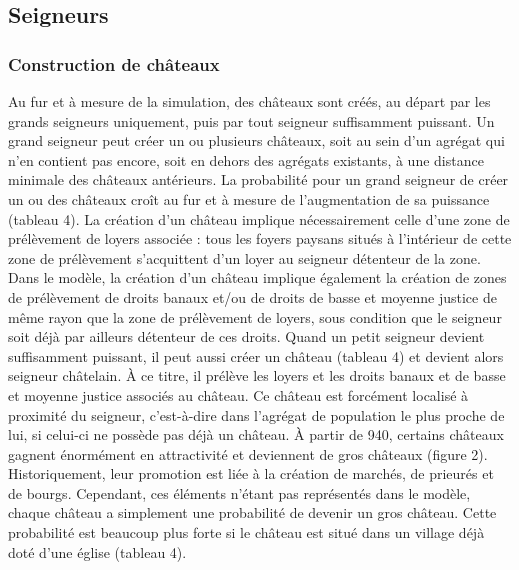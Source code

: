 \subsection{Seigneurs}

\subsubsection{Construction de châteaux}

Au fur et à mesure de la simulation, des châteaux sont créés, au départ par les grands seigneurs uniquement, puis par tout seigneur suffisamment puissant.
Un grand seigneur peut créer un ou plusieurs châteaux, soit au sein d'un agrégat qui n'en contient pas encore, soit en dehors des agrégats existants, à une distance minimale des châteaux antérieurs.
La probabilité pour un grand seigneur de créer un ou des châteaux croît au fur et à mesure de l'augmentation de sa puissance (tableau 4).
La création d'un château implique nécessairement celle d'une zone de prélèvement de loyers associée :
tous les foyers paysans situés à l'intérieur de cette zone de prélèvement s'acquittent d'un loyer au seigneur détenteur de la zone.
Dans le modèle, la création d'un château implique également la création de zones de prélèvement de droits banaux et/ou de droits de basse et moyenne justice de même rayon que la zone de prélèvement de loyers, sous condition que le seigneur soit déjà par ailleurs détenteur de ces droits.
Quand un petit seigneur devient suffisamment puissant, il peut aussi créer un château (tableau 4) et devient alors seigneur châtelain.
À ce titre, il prélève les loyers et les droits banaux et de basse et moyenne justice associés au château.
Ce château est forcément localisé à proximité du seigneur, c'est-à-dire dans l'agrégat de population le plus proche de lui, si celui-ci ne possède pas déjà un château.
À partir de 940, certains châteaux gagnent énormément en attractivité et deviennent de gros châteaux (figure 2).
Historiquement, leur promotion est liée à la création de marchés, de prieurés et de bourgs.
Cependant, ces éléments n'étant pas représentés dans le modèle, chaque château a simplement une probabilité de devenir un gros château.
Cette probabilité est beaucoup plus forte si le château est situé dans un village déjà doté d'une église (tableau 4).


